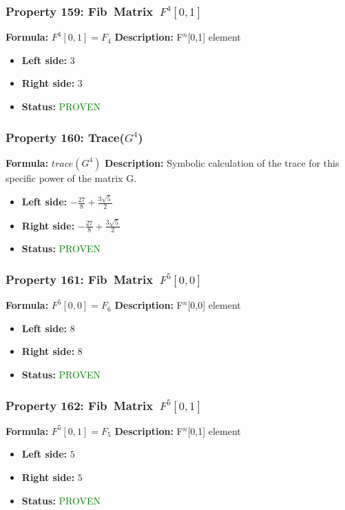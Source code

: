 \subsubsection*{Property 159: Fib~Matrix~$F^{4}$$[0,1]$}
\textbf{Formula:} $F^4[0,1] = F_4$
\textbf{Description:} F$^n$[0,1] element

\begin{itemize}
\item \textbf{Left side:} $3$
\item \textbf{Right side:} $3$
\item \textbf{Status:} \textcolor{green}{PROVEN}
\end{itemize}

\subsubsection*{Property 160: Trace($G^{4}$)}
\textbf{Formula:} $trace(G^4)$
\textbf{Description:} Symbolic calculation of the trace for this specific power of the matrix G.

\begin{itemize}
\item \textbf{Left side:} $- \frac{27}{8} + \frac{3 \sqrt{5}}{2}$
\item \textbf{Right side:} $- \frac{27}{8} + \frac{3 \sqrt{5}}{2}$
\item \textbf{Status:} \textcolor{green}{PROVEN}
\end{itemize}

\subsubsection*{Property 161: Fib~Matrix~$F^{5}$$[0,0]$}
\textbf{Formula:} $F^5[0,0] = F_6$
\textbf{Description:} F$^n$[0,0] element

\begin{itemize}
\item \textbf{Left side:} $8$
\item \textbf{Right side:} $8$
\item \textbf{Status:} \textcolor{green}{PROVEN}
\end{itemize}

\subsubsection*{Property 162: Fib~Matrix~$F^{5}$$[0,1]$}
\textbf{Formula:} $F^5[0,1] = F_5$
\textbf{Description:} F$^n$[0,1] element

\begin{itemize}
\item \textbf{Left side:} $5$
\item \textbf{Right side:} $5$
\item \textbf{Status:} \textcolor{green}{PROVEN}
\end{itemize}

